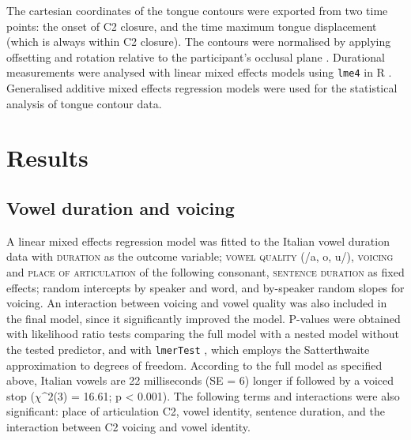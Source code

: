 \documentclass[authoryear, twocolumn]{elsarticle}
\begin{document}
The cartesian coordinates of the tongue contours were exported from two
time points: the onset of C2 closure, and the time maximum tongue
displacement (which is always within C2 closure). The contours were
normalised by applying offsetting and rotation relative to the
participant's occlusal plane \citep{scobbie2011}. Durational
measurements were analysed with linear mixed effects models using
\texttt{lme4} in R \citep{r-core-team2017, bates2015}. Generalised
additive mixed effects regression models \citep[GAMMs,][]{wood2006} were
used for the statistical analysis of tongue contour data.

\section{Results}\label{results}

\subsection{Vowel duration and
voicing}\label{vowel-duration-and-voicing}

A linear mixed effects regression model was fitted to the Italian vowel
duration data with \textsc{duration} as the outcome variable;
\textsc{vowel quality} (/a, o, u/), \textsc{voicing} and
\textsc{place of articulation} of the following consonant,
\textsc{sentence duration} as fixed effects; random intercepts by
speaker and word, and by-speaker random slopes for voicing. An
interaction between voicing and vowel quality was also included in the
final model, since it significantly improved the model. P-values were
obtained with likelihood ratio tests comparing the full model with a
nested model without the tested predictor, and with \texttt{lmerTest}
\citep{kuznetsova2016}, which employs the Satterthwaite approximation to
degrees of freedom. According to the full model as specified above,
Italian vowels are 22 milliseconds (SE = 6) longer if followed by a
voiced stop (\(\chi\^2\)(3) = 16.61; p \textless{} 0.001). The following
terms and interactions were also significant: place of articulation C2,
vowel identity, sentence duration, and the interaction between C2
voicing and vowel identity.
\end{document}
